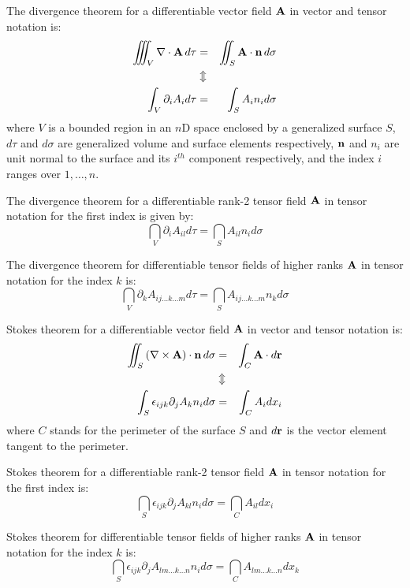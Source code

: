  The divergence theorem for a differentiable vector field
$\mathbf{ A}$ in vector and tensor notation is:
\begin{eqnarray}
\iiint_{V}\nabla\cdot\mathbf{ A}\,d\tau & = & 
\iint_{S}\mathbf{ A}\cdot\mathbf{ n}\,d\sigma\nonumber \\
 & \Updownarrow\\
\displaystyle\int_{V}\partial_{i}A_{i}d\tau & = & \displaystyle\int_{S}A_{i}n_{i}d\sigma\nonumber
\end{eqnarray}
where $V$ is a bounded region in an $n$D space enclosed by a generalized
surface $S$, $d\tau$ and $d\sigma$ are generalized volume and surface
elements respectively, $\mathbf{ n}$ and $n_{i}$ are unit normal
to the surface and its $i^{th}$ component respectively, and the index
$i$ ranges over $1,\ldots,n$.

 The divergence theorem for a differentiable rank-2 tensor
field $\mathbf{ A}$ in tensor notation for the first index is given
by:
\begin{equation}
\dint_{V}\partial_{i}A_{il}d\tau=\dint_{S}A_{il}n_{i}d\sigma
\end{equation}


 The divergence theorem for differentiable tensor fields
of higher ranks $\mathbf{ A}$ in tensor notation for the index $k$
is:
\begin{equation}
\dint_{V}\partial_{k}A_{ij\ldots k\ldots m}d\tau=\dint_{S}A_{ij\ldots k\ldots 
m}n_{k}d\sigma
\end{equation}


 Stokes theorem for a differentiable vector field $\mathbf{ A}$
in vector and tensor notation is:
\begin{eqnarray}
\iint_{S}\left(\nabla\times\mathbf{ A}\right)\cdot\mathbf{ n}\,d\sigma & = & 
\displaystyle\int_{C}\mathbf{ A}\cdot d\mathbf{ r}\nonumber \\
 & \Updownarrow\\
\displaystyle\int_{S}\epsilon_{ijk}\partial_{j}A_{k}n_{i}d\sigma & = & 
\displaystyle\int_{C}A_{i}dx_{i}\nonumber
\end{eqnarray}
where $C$ stands for the perimeter of the surface $S$ and $d\mathbf{ r}$
is the vector element tangent to the perimeter.

 Stokes theorem for a differentiable rank-2 tensor field
$\mathbf{ A}$ in tensor notation for the first index is:
\begin{equation}
\dint_{S}\epsilon_{ijk}\partial_{j}A_{kl}n_{i}d\sigma=\dint_{C}A_{il}dx_{i}
\end{equation}


 Stokes theorem for differentiable tensor fields of higher
ranks $\mathbf{ A}$ in tensor notation for the index $k$ is:
\begin{equation}
\dint_{S}\epsilon_{ijk}\partial_{j}A_{lm\ldots k\ldots 
n}n_{i}d\sigma=\dint_{C}A_{lm\ldots k\ldots n}dx_{k}
\end{equation}



